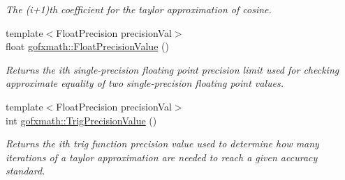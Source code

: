 \begin{DoxyCompactItemize}
\begin{DoxyCompactList}\small\item\em The (i+1)th coefficient for the taylor approximation of cosine. \end{DoxyCompactList}\item 
{\footnotesize template$<$Float\+Precision precision\+Val$>$ }\\float \hyperlink{group___scalar_math_consts_ga0d7e921997d870cf603b42e6741dd7db}{gofxmath\+::\+Float\+Precision\+Value} ()
\begin{DoxyCompactList}\small\item\em Returns the ith single-\/precision floating point precision limit used for checking approximate equality of two single-\/precision floating point values. \end{DoxyCompactList}\item 
\hypertarget{group___scalar_math_consts_ga342bf08edf4feeccb1f216b558064211}{}{\footnotesize template$<$Float\+Precision precision\+Val$>$ }\\int \hyperlink{group___scalar_math_consts_ga342bf08edf4feeccb1f216b558064211}{gofxmath\+::\+Trig\+Precision\+Value} ()\label{group___scalar_math_consts_ga342bf08edf4feeccb1f216b558064211}

\begin{DoxyCompactList}\small\item\em Returns the ith trig function precision value used to determine how many iterations of a taylor approximation are needed to reach a given accuracy standard. \end{DoxyCompactList}\end{DoxyCompactItemize}
